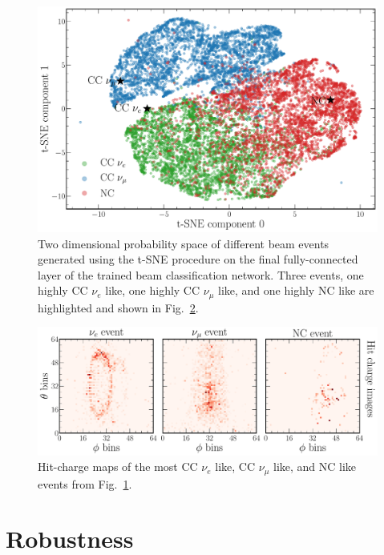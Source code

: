 \begin{figure} %
    \includegraphics[width=\textwidth]{diagrams/7-results/final_beam_tsne.pdf}
    \caption[Beam classification network t-SNE space]
    {Two dimensional probability space of different beam events generated using the t-SNE
        procedure on the final fully-connected layer of the trained beam classification network.
        Three events, one highly CC $\nu_{e}$ like, one highly CC $\nu_{\mu}$ like, and one highly
        NC like are highlighted and shown in Fig.~\ref{fig:final_beam_tsne_events}.}
    \label{fig:final_beam_tsne}
\end{figure}

\begin{figure} %
    \includegraphics[width=\textwidth]{diagrams/7-results/final_beam_tsne_events.pdf}
    \caption[Hit-charge maps of highly CC $\nu_{e}$ like, CC $\nu_{\mu}$ like, and NC like events]
    {Hit-charge maps of the most CC $\nu_{e}$ like, CC $\nu_{\mu}$ like, and NC like events from
        Fig.~\ref{fig:final_beam_tsne}.}
    \label{fig:final_beam_tsne_events}
\end{figure}

\section{Robustness} %
\label{sec:results_robust} %

